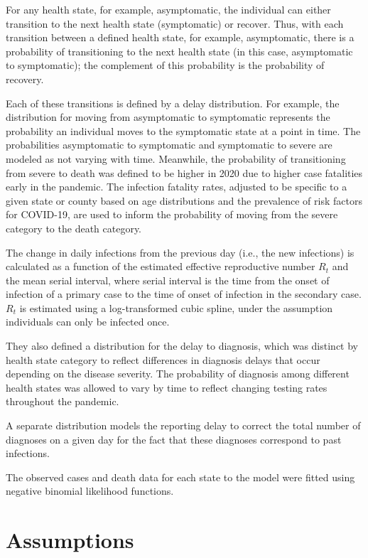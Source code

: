 \documentclass[12pt,twoside]{smiththesis}
\begin{document}
For any health state, for example, asymptomatic, the individual can either transition to the next health state (symptomatic) or recover. Thus, with each transition between a defined health state, for example, asymptomatic, there is a probability of transitioning to the next health state (in this case, asymptomatic to symptomatic); the complement of this probability is the probability of recovery.

Each of these transitions is defined by a delay distribution. For example, the distribution for moving from asymptomatic to symptomatic represents the probability an individual moves to the symptomatic state at a point in time. The probabilities asymptomatic to symptomatic and symptomatic to severe are modeled as not varying with time. Meanwhile, the probability of transitioning from severe to death was defined to be higher in 2020 due to higher case fatalities early in the pandemic. The infection fatality rates, adjusted to be specific to a given state or county based on age distributions and the prevalence of risk factors for COVID-19, are used to inform the probability of moving from the severe category to the death category.

The change in daily infections from the previous day (i.e., the new infections) is calculated as a function of the estimated effective reproductive number \(R_t\) and the mean serial interval, where serial interval is the time from the onset of infection of a primary case to the time of onset of infection in the secondary case. \(R_t\) is estimated using a log-transformed cubic spline, under the assumption individuals can only be infected once.

They also defined a distribution for the delay to diagnosis, which was distinct by health state category to reflect differences in diagnosis delays that occur depending on the disease severity.
The probability of diagnosis among different health states was allowed to vary by time to reflect changing testing rates throughout the pandemic.

A separate distribution models the reporting delay to correct the total number of diagnoses on a given day for the fact that these diagnoses correspond to past infections.

The observed cases and death data for each state to the model were fitted using negative binomial likelihood functions.

\hypertarget{assumptions}{%
\section{Assumptions}\label{assumptions}}
\end{document}
